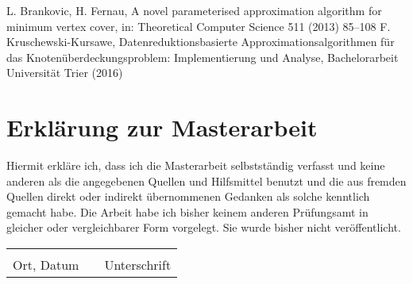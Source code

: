 \documentclass[12pt,onecolumn, notitlepage]{scrartcl}
\begin{document}
\newpage


\begin{thebibliography}{mustermarke}
 L. Brankovic, H. Fernau, A novel parameterised approximation algorithm for
minimum vertex cover, in: Theoretical Computer Science 511 (2013) 85–108
 F. Kruschewski-Kursawe, Datenreduktionsbasierte Approximationsalgorithmen für das Knotenüberdeckungsproblem: Implementierung und Analyse, Bachelorarbeit Universität Trier (2016)




\end{thebibliography}


\newpage
\section*{Erklärung zur Masterarbeit}

Hiermit erkläre ich, dass ich die Masterarbeit selbstständig verfasst und keine anderen als die angegebenen Quellen und Hilfsmittel benutzt und die aus fremden Quellen direkt oder indirekt übernommenen Gedanken als solche kenntlich gemacht habe.\newline
Die Arbeit habe ich bisher keinem anderen Prüfungsamt in gleicher oder vergleichbarer Form vorgelegt. Sie wurde bisher nicht veröffentlicht.
\\[120pt]

\begin{tabular}{lp{2em}l} 
 \hspace{5cm}   && \hspace{4cm} \\\cline{1-1}\cline{3-3} 
 Ort, Datum     && Unterschrift 
\end{tabular} 
\end{document}
